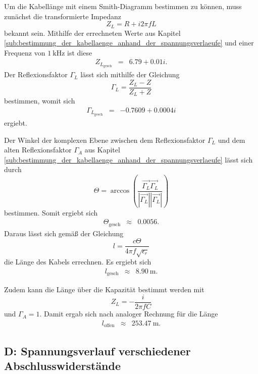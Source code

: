 Um die Kabellänge mit einem Smith-Diagramm bestimmen zu können, muss zunächst die transformierte Impedanz 
\begin{equation*}
	Z_L = R + i 2 \pi f L
\end{equation*}
bekannt sein.
Mithilfe der errechneten Werte aus Kapitel \ref{sub:bestimmung_der_kabellaenge_anhand_der_spannungsverlaeufe} und einer Frequenz von $\SI{1}{\kilo\hertz}$ ist diese
\begin{eqnarray*}
	Z_{L_\text{gesch}} &=& 6.79 + 0.01i.
\end{eqnarray*}
Der Reflexionsfaktor $\Gamma_L$ lässt sich mithilfe der Gleichung
\begin{equation*}
	\Gamma_L = \frac{Z_L-Z}{Z_L+Z}
\end{equation*}
bestimmen, womit sich
\begin{eqnarray*}
	\Gamma_{L_\text{gesch}} &=& -0.7609 + 0.0004i
\end{eqnarray*}
ergiebt.

Der Winkel der komplexen Ebene zwischen dem Reflexionsfaktor $\Gamma_L$ und dem alten Reflexionsfaktor $\Gamma_A$ aus Kapitel \ref{sub:bestimmung_der_kabellaenge_anhand_der_spannungsverlaeufe} lässt sich durch
\begin{equation*}
	\Theta = \arccos \left(\frac{\vec{\Gamma_L}\vec{\Gamma_L}}{|\vec{\Gamma_L}||\vec{\Gamma_L}|}\right)
\end{equation*}
bestimmen.
Somit ergiebt sich
\begin{eqnarray*}
	\Theta_\text{gesch} &\approx& 0.0056.
\end{eqnarray*}
Daraus lässt sich gemäß der Gleichung
\begin{equation*}
	l = \frac{c \Theta}{4 \pi f \sqrt{\epsilon_r}}
\end{equation*}
die Länge des Kabels errechnen.
Es ergiebt sich
\begin{eqnarray*}
	l_\text{gesch} &\approx& \SI{8.90}{\meter}.
\end{eqnarray*}

Zudem kann die Länge über die Kapazität bestimmt werden mit
\begin{equation*}
	Z_L = -\frac{i}{2 \pi f C}
\end{equation*}
und $\Gamma_A = 1$.
Damit ergab sich nach analoger Rechnung für die Länge
\begin{eqnarray*}
	l_\text{offen} &\approx& \SI{253.47}{\meter}.
\end{eqnarray*}

\FloatBarrier
\subsection{D: Spannungsverlauf verschiedener Abschlusswiderstände} %
\label{sub:spannungsverlauf_verschiedener_abschlusswiderstaende}

